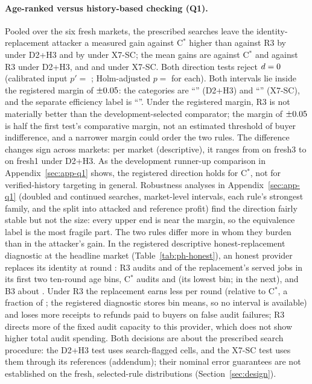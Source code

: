 \documentclass[11pt]{article}
\begin{document}
\paragraph{Age-ranked versus history-based checking (Q1).} Pooled over the six fresh markets, the prescribed searches leave the identity-replacement attacker a measured gain against C$^*$ higher than against R3 by  under D2+H3 and by  under X7-SC; the mean gains are  against C$^*$ and  against R3 under D2+H3, and  and  under X7-SC. Both direction tests reject $d = 0$ (calibrated input $p' = $ ; Holm-adjusted $p = $  for each). Both intervals lie inside the registered margin of $\pm0.05$: the categories are ``'' (D2+H3) and ``'' (X7-SC), and the separate efficiency label is ``''. Under the registered margin, R3 is not materially better than the development-selected comparator; the margin of $\pm0.05$ is half the first test's comparative margin, not an estimated threshold of buyer indifference, and a narrower margin could order the two rules. The difference changes sign across markets: per market (descriptive), it ranges from  on fresh3 to  on fresh1 under D2+H3. As the development runner-up comparison in Appendix~\ref{sec:app-q1} shows, the registered direction holds for C$^*$, not for verified-history targeting in general. Robustness analyses in Appendix~\ref{sec:app-q1} (doubled and continued searches, market-level intervals, each rule's strongest family, and the split into attacked and reference profit) find the direction fairly stable but not the size: every upper end is near the margin, so the equivalence label is the most fragile part. The two rules differ more in whom they burden than in the attacker's gain. In the registered descriptive honest-replacement diagnostic at the headline market (Table~\ref{tab:ph-honest}), an honest provider replaces its identity at round : R3 audits  and  of the replacement's served jobs in its first two ten-round age bins, C$^*$ audits  and  (its lowest bin;  in the next), and B3 about . Under R3 the replacement earns less per round (relative to C$^*$, a fraction of ; the registered diagnostic stores bin means, so no interval is available) and loses more receipts to refunds paid to buyers on false audit failures; R3 directs more of the fixed audit capacity to this provider, which does not show higher total audit spending. Both decisions are about the prescribed search procedure: the D2+H3 test uses search-flagged cells, and the X7-SC test uses them through its references (addendum); their nominal error guarantees are not established on the fresh, selected-rule distributions (Section~\ref{sec:design}).
\end{document}
